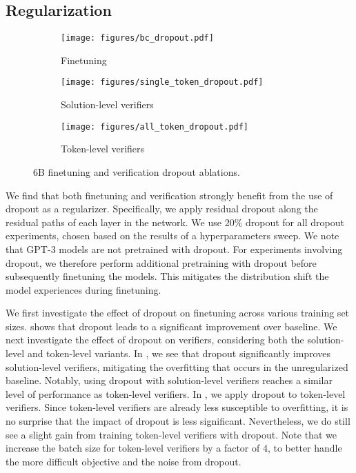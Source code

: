 {\subsection{Regularization}

\begin{figure}
\centering
\begin{subfigure}{0.32 \textwidth}
\texttt{[image: figures/bc\_dropout.pdf]}
\caption{Finetuning} \label{fig:bc_dropout}
\end{subfigure}
\hspace*{\fill}
\begin{subfigure}{0.32 \textwidth}
\texttt{[image: figures/single\_token\_dropout.pdf]}
\caption{Solution-level verifiers} \label{fig:single_token_dropout}
\end{subfigure}
\hspace*{\fill}
\begin{subfigure}{0.32 \textwidth}
\texttt{[image: figures/all\_token\_dropout.pdf]}
\caption{Token-level verifiers} \label{fig:all_token_dropout}
\end{subfigure}
\caption{6B finetuning and verification dropout ablations.}
\label{fig:dropout_ablations}
\end{figure}

 We find that both finetuning and verification strongly benefit from the use of dropout as a regularizer. Specifically, we apply residual dropout \citep{vaswani2017attention} along the residual paths of each layer in the network. We use 20\% dropout for all dropout experiments, chosen based on the results of a hyperparameters sweep. We note that GPT-3 models are not pretrained with dropout. For experiments involving dropout, we therefore perform additional pretraining with dropout before subsequently finetuning the models. This mitigates the distribution shift the model experiences during finetuning.

 We first investigate the effect of dropout on finetuning across various training set sizes.  shows that dropout leads to a significant improvement over baseline. We next investigate the effect of dropout on verifiers, considering both the solution-level and token-level variants. In , we see that dropout significantly improves solution-level verifiers, mitigating the overfitting that occurs in the unregularized baseline. Notably, using dropout with solution-level verifiers reaches a similar level of performance as token-level verifiers. In , we apply dropout to token-level verifiers. Since token-level verifiers are already less susceptible to overfitting, it is no surprise that the impact of dropout is less significant. Nevertheless, we do still see a slight gain from training token-level verifiers with dropout. Note that we increase the batch size for token-level verifiers by a factor of 4, to better handle the more difficult objective and the noise from dropout.

}
